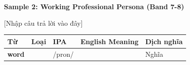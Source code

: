 \textbf{Sample 2: Working Professional Persona (Band 7-8)}

[Nhập câu trả lời vào đây]

\separator


\vspace{0.8em}
\begin{center}
\renewcommand{\arraystretch}{1.65}
\begin{tabularx}{\textwidth}{|V{0.22\textwidth}|C{0.07\textwidth}|I{0.20\textwidth}|Y|V{0.18\textwidth}|}
\hline
{}
\textbf{Từ} & \textbf{Loại} & \textbf{IPA} & \textbf{English Meaning} & \textbf{Dịch nghĩa} \\
\hline
\textbf{word} & & /pron/ & & Nghĩa \\ \hline
\end{tabularx}
\end{center}

\newpage

